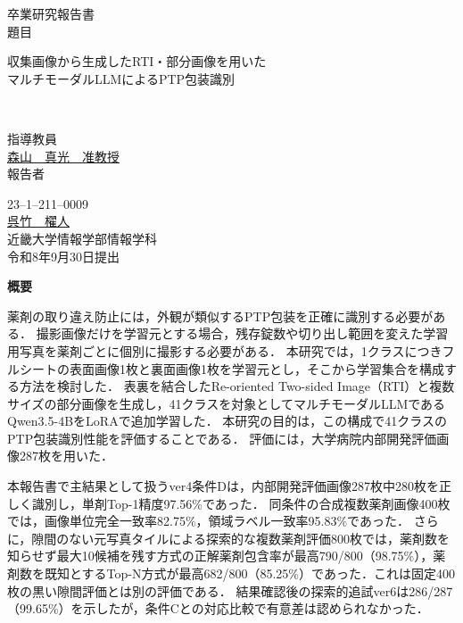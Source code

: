 \documentclass[uplatex,dvipdfmx]{jsarticle}
\begin{document}
\pagestyle{empty}

\begin{center}
\vspace*{1cm}
\large
{\LARGE 卒業研究報告書}\\
\vspace*{0.8cm}
題目\\
\vspace*{1cm}
\parbox{15.5cm}{\centering\LARGE
収集画像から生成したRTI・部分画像を用いた\\[2mm]
マルチモーダルLLMによるPTP包装識別}\\
\vspace{3mm}

\vspace*{3cm}
指導教員\\
\vspace*{0.3cm}
\underline{\LARGE 森山　真光　准教授}\\
\vspace*{3cm}
報告者\\
\vspace*{0.3cm}

{23--1--211--0009}\\
\vspace*{0.3cm}
\underline{\Huge 呉竹　櫂人}\\
\vspace*{0.5cm}
近畿大学情報学部情報学科\\
\vspace*{2cm}
令和8年9月30日提出\\
\end{center}

\newpage
\normalsize

\clearpage
\begin{center}
{\bf \Large 概要}
\end{center}

薬剤の取り違え防止には，外観が類似するPTP包装を正確に識別する必要がある．
撮影画像だけを学習元とする場合，残存錠数や切り出し範囲を変えた学習用写真を薬剤ごとに個別に撮影する必要がある．
本研究では，1クラスにつきフルシートの表面画像1枚と裏面画像1枚を学習元とし，そこから学習集合を構成する方法を検討した．
表裏を結合したRe-oriented Two-sided Image（RTI）と複数サイズの部分画像を生成し，41クラスを対象としてマルチモーダルLLMであるQwen3.5-4BをLoRAで追加学習した．
本研究の目的は，この構成で41クラスのPTP包装識別性能を評価することである．
評価には，大学病院内部開発評価画像287枚を用いた．

本報告書で主結果として扱うver4条件Dは，内部開発評価画像287枚中280枚を正しく識別し，単剤Top-1精度97.56\%であった．
同条件の合成複数薬剤画像400枚では，画像単位完全一致率82.75\%，領域ラベル一致率95.83\%であった．
さらに，隙間のない元写真タイルによる探索的な複数薬剤評価800枚では，薬剤数を知らせず最大10候補を残す方式の正解薬剤包含率が最高790/800（98.75\%），薬剤数を既知とするTop-N方式が最高682/800（85.25\%）であった．これは固定400枚の黒い隙間評価とは別の評価である．
結果確認後の探索的追試ver6は286/287（99.65\%）を示したが，条件Cとの対応比較で有意差は認められなかった．
\end{document}
